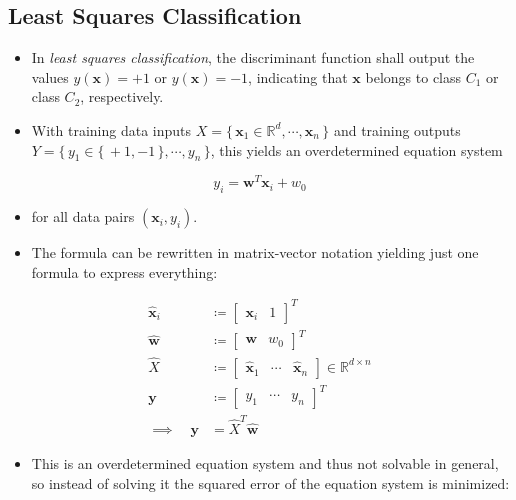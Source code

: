 \documentclass[a4paper, 11pt, accentcolor = tud3b]{tudreport}
\newcommand{\R}{\ensuremath{\mathbb{R}}}
\renewcommand{\vec}[1]{\mathbf{#1}}
\begin{document}
			\subsection{Least Squares Classification}
				\begin{itemize}
					\item In \emph{least squares classification}, the discriminant function shall output the values \( y(\vec{x}) = +1 \) or \( y(\vec{x}) = -1 \), indicating that \(\vec{x}\) belongs to class \(C_1\) or class \(C_2\), respectively.
					\item With training data inputs \( X = \{\, \vec{x}_1 \in \R^d, \cdots, \vec{x}_n \,\} \) and training outputs \( Y = \{\, y_1 \in \{\, +1, -1 \,\}, \cdots, y_n \,\} \), this yields an overdetermined equation system
				\end{itemize}
				\begin{equation}
					y_i = \vec{w}^T \vec{x}_i + w_0
				\end{equation}
				\begin{itemize}
					\item[] for all data pairs \( (\vec{x}_i, y_i) \).
					\item The formula can be rewritten in matrix-vector notation yielding just one formula to express everything:
				\end{itemize}
				\begin{align}
					\hat{\vec{x}}_i &\coloneqq \begin{bmatrix} \vec{x}_i & 1 \end{bmatrix}^T \\
					\hat{\vec{w}} &\coloneqq \begin{bmatrix} \vec{w} & w_0 \end{bmatrix}^T \\
					\hat{X} &\coloneqq \begin{bmatrix} \hat{\vec{x}}_1 & \cdots & \hat{\vec{x}}_n \end{bmatrix} \in \R^{d \times n} \\
					\vec{y} &\coloneqq \begin{bmatrix} y_1 & \cdots & y_n \end{bmatrix}^T \\
					\implies\quad \vec{y} &= \hat{X}^T\hat{\vec{w}}
				\end{align}
				\begin{itemize}
					\item This is an overdetermined equation system and thus not solvable in general, so instead of solving it the squared error of the equation system is minimized:
				\end{itemize}
\end{document}
